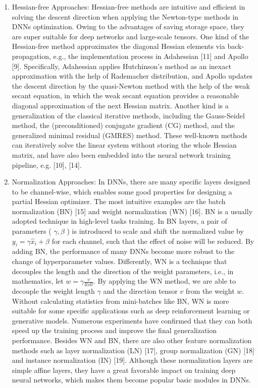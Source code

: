 \documentclass[conference]{IEEEtran}
\begin{document}
\begin{enumerate}
  \item Hessian-free Approaches: Hessian-free methods are intuitive and efficient in solving the descent direction when applying the Newton-type methods in DNNs optimization. Owing to the advantages of saving storage space, they are super suitable for deep networks and large-scale tensors. One kind of the Hessian-free method approximates the diagonal Hessian elements via back-propagation, e.g., the implementation process in Adahessian [11] and Apollo [9]. Specifically, Adahessian applies Hutchinson's method as an inexact approximation with the help of Rademacher distribution, and Apollo updates the descent direction by the quasi-Newton method with the help of the weak secant equation, in which the weak secant equation provides a reasonable diagonal approximation of the next Hessian matrix. Another kind is a generalization of the classical iterative methods, including the Gauss-Seidel method, the (preconditioned) conjugate gradient (CG) method, and the generalized minimal residual (GMRES) method. These well-known methods can iteratively solve the linear system without storing the whole Hessian matrix, and have also been embedded into the neural network training pipeline, e.g. [10], [14].
  \item Normalization Approaches: In DNNs, there are many specific layers designed to be channel-wise, which enables some good properties for designing a partial Hessian optimizer. The most intuitive examples are the batch normalization (BN) [15] and weight normalization (WN) [16]. BN is a usually adopted technique in high-level tasks training. In BN layers, a pair of parameters ( $\gamma, \beta$ ) is introduced to scale and shift the normalized value by $y_{i}=\gamma \hat{x}_{i}+\beta$ for each channel, such that the effect of noise will be reduced. By adding BN, the performance of many DNNs become more robust to the change of hyperparameter values. Differently, WN is a technique that decouples the length and the direction of the weight parameters, i.e., in mathematics, let $w=\gamma \frac{v}{l l v l l}$. By applying the WN method, we are able to decouple the weight length $\gamma$ and the direction tensor $v$ from the weight $w$. Without calculating statistics from mini-batches like BN, WN is more suitable for some specific applications such as deep reinforcement learning or generative models. Numerous experiments have confirmed that they can both speed up the training process and improve the final generalization performance. Besides WN and BN, there are also other feature normalization methods such as layer normalization (LN) [17], group normalization (GN) [18] and instance normalization (IN) [19]. Although these normalization layers are simple affine layers, they have a great favorable impact on training deep neural networks, which makes them become popular basic modules in DNNs.
\end{enumerate}
\end{document}
